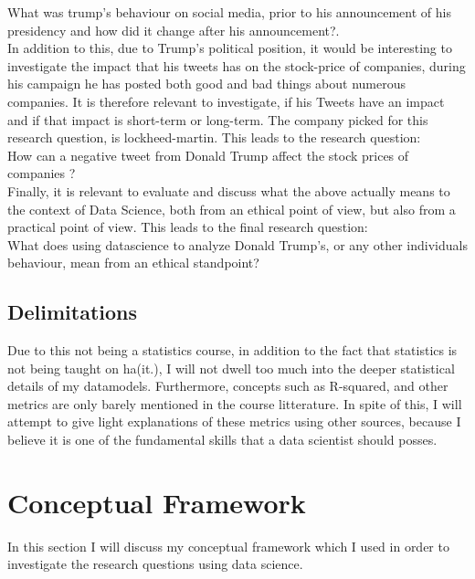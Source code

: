 \documentclass[11pt]{article}
\begin{document}
\par\vspace{10pt}

What was trump's behaviour on social media, prior to his announcement of his presidency and how did it change after his announcement?.\\

In addition to this, due to Trump's political position, it would be interesting to investigate the impact that his tweets has on the stock-price of companies, during his campaign he has posted both good and bad things about numerous companies. It is therefore relevant to investigate, if his Tweets have an impact and if that impact is short-term or long-term. The company picked for this research question, is lockheed-martin. This leads to the research question:\\

How can a negative tweet from Donald Trump affect the stock prices of companies ? \\

Finally, it is relevant to evaluate and discuss what the above actually means to the context of Data Science, both from an ethical point of view, but also from a practical point of view. This leads to the final research question: \\

What does using datascience to analyze Donald Trump's, or any other individuals behaviour, mean from an ethical standpoint?
 
\subsection{Delimitations}
Due to this not being a statistics course, in addition to the fact that statistics is not being taught on ha(it.), I will not dwell too much into the deeper statistical details of my datamodels. Furthermore, concepts such as R-squared,  and other metrics are only barely mentioned in the course litterature. In spite of this, I will attempt to give light explanations of these metrics using other sources, because I believe it is one of the fundamental skills that a data scientist should posses.

\section{Conceptual Framework}
In this section I will discuss my conceptual framework which I used in order to investigate the research questions using data science.
\end{document}
